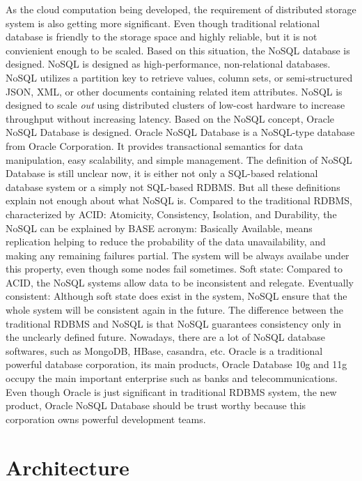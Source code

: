 As the cloud computation being developed, the requirement of distributed storage system is also getting more significant. Even though traditional relational database is friendly to the storage space and highly reliable, but it is not convienient enough to be scaled. Based on this situation, the NoSQL database is designed. 
NoSQL is designed as high-performance, non-relational databases. NoSQL utilizes a partition key to retrieve values, column sets, or semi-structured JSON, XML, or other documents containing related item attributes. NoSQL is designed to scale \emph{out} using distributed clusters of low-cost hardware to increase throughput without increasing latency.
Based on the NoSQL concept, Oracle NoSQL Database is designed. Oracle NoSQL Database is a NoSQL-type database from Oracle Corporation. It provides transactional semantics for data manipulation, easy scalability, and simple management.
The definition of NoSQL Database is still unclear now, it is either not only a SQL-based relational database system or a simply not SQL-based RDBMS. But all these definitions explain not enough about what NoSQL is. Compared to the traditional RDBMS, characterized by ACID: Atomicity, Consistency, Isolation, and Durability, the NoSQL can be explained by BASE acronym:
Basically Available, means replication helping to reduce the probability of the data unavailability, and making any remaining failures partial. The system will be always availabe under this property, even though some nodes fail sometimes.
Soft state: Compared to ACID, the NoSQL systems allow data to be inconsistent and relegate.
Eventually consistent: Although soft state does exist in the system, NoSQL ensure that the whole system will be consistent again in the future. The difference between the traditional RDBMS and NoSQL is that NoSQL guarantees consistency only in the unclearly defined future.
Nowadays, there are a lot of NoSQL database softwares, such as MongoDB, HBase, casandra, etc. Oracle is a traditional powerful database corporation, its main products, Oracle Database 10g and 11g occupy the main important enterprise such as banks and 
telecommunications. Even though Oracle is just significant in traditional RDBMS system, the new product, Oracle NoSQL Database should be trust worthy because this corporation owns powerful development teams. 


\section{Architecture}

